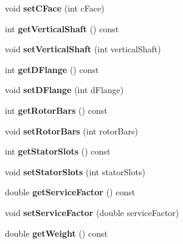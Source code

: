\begin{DoxyCompactItemize}
void {\bfseries set\+C\+Face} (int c\+Face)
\item 
\mbox{\label{class_motor_data_a585d6ab659268e3bab059ef9d93eb46b}} 
int {\bfseries get\+Vertical\+Shaft} () const
\item 
\mbox{\label{class_motor_data_ae4fa754b2e93bcc16c7385d44e11c23c}} 
void {\bfseries set\+Vertical\+Shaft} (int vertical\+Shaft)
\item 
\mbox{\label{class_motor_data_a2273d76165ea25713fa0f558d12cf502}} 
int {\bfseries get\+D\+Flange} () const
\item 
\mbox{\label{class_motor_data_a311e514d5e2ffef3686fd13be419a709}} 
void {\bfseries set\+D\+Flange} (int d\+Flange)
\item 
\mbox{\label{class_motor_data_a4cb342d2f3c4c1052fd20dc242a3bc25}} 
int {\bfseries get\+Rotor\+Bars} () const
\item 
\mbox{\label{class_motor_data_a49d255916169aeb72d1487bf641eec45}} 
void {\bfseries set\+Rotor\+Bars} (int rotor\+Bars)
\item 
\mbox{\label{class_motor_data_a3a535de88d00acc7500aa0be7104e2aa}} 
int {\bfseries get\+Stator\+Slots} () const
\item 
\mbox{\label{class_motor_data_af2abc9117562a419d707c2aebfbd6162}} 
void {\bfseries set\+Stator\+Slots} (int stator\+Slots)
\item 
\mbox{\label{class_motor_data_a5016b9883b420f0a3fd0932c80a3db1d}} 
double {\bfseries get\+Service\+Factor} () const
\item 
\mbox{\label{class_motor_data_a295821781e50c9ab969a0c4987fe6d88}} 
void {\bfseries set\+Service\+Factor} (double service\+Factor)
\item 
\mbox{\label{class_motor_data_a12903f6e79416bffa80b217dee6cbc8c}} 
double {\bfseries get\+Weight} () const
\item 
\mbox{\label{class_motor_data_aadf0258ade287078a57493644b90c12a}} 

\end{DoxyCompactItemize}
